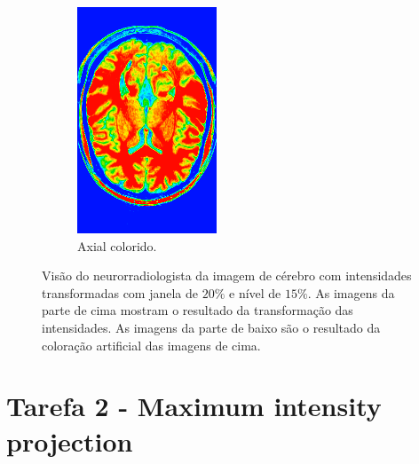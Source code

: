 \documentclass{article}
\begin{document}
\begin{figure}[H]
\begin{subfigure}[b]{0.3\textwidth}
        \includegraphics[width=\textwidth]{brain/neuroradiologist-axial.png}
        \caption{Axial colorido.}
    \end{subfigure}
    \caption{Visão do neurorradiologista da imagem de cérebro com intensidades transformadas com janela de $20\%$ e nível de $15\%$. As imagens da parte de cima mostram o resultado da transformação das intensidades. As imagens da parte de baixo são o resultado da coloração artificial das imagens de cima.}
    \label{fig:brain-visao-neurorradiologista-cores}
\end{figure}

\section{Tarefa 2 - Maximum intensity projection}
\end{document}
